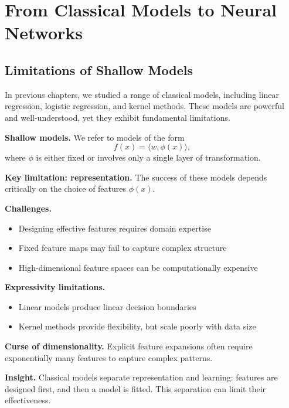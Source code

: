 \chapter{From Classical Models to Neural Networks}

\section{Limitations of Shallow Models}

In previous chapters, we studied a range of classical models, including linear regression, logistic regression, and kernel methods. These models are powerful and well-understood, yet they exhibit fundamental limitations.

\medskip

\noindent
\textbf{Shallow models.}  
We refer to models of the form
\[
f(x) = \langle w, \phi(x) \rangle,
\]
where $\phi$ is either fixed or involves only a single layer of transformation.

\medskip

\noindent
\textbf{Key limitation: representation.}  
The success of these models depends critically on the choice of features $\phi(x)$.

\medskip

\noindent
\textbf{Challenges.}
\begin{itemize}
    \item Designing effective features requires domain expertise
    \item Fixed feature maps may fail to capture complex structure
    \item High-dimensional feature spaces can be computationally expensive
\end{itemize}

\medskip

\noindent
\textbf{Expressivity limitations.}
\begin{itemize}
    \item Linear models produce linear decision boundaries
    \item Kernel methods provide flexibility, but scale poorly with data size
\end{itemize}

\medskip

\noindent
\textbf{Curse of dimensionality.}  
Explicit feature expansions often require exponentially many features to capture complex patterns.

\medskip

\noindent
\textbf{Insight.}  
Classical models separate representation and learning: features are designed first, and then a model is fitted. This separation can limit their effectiveness.

